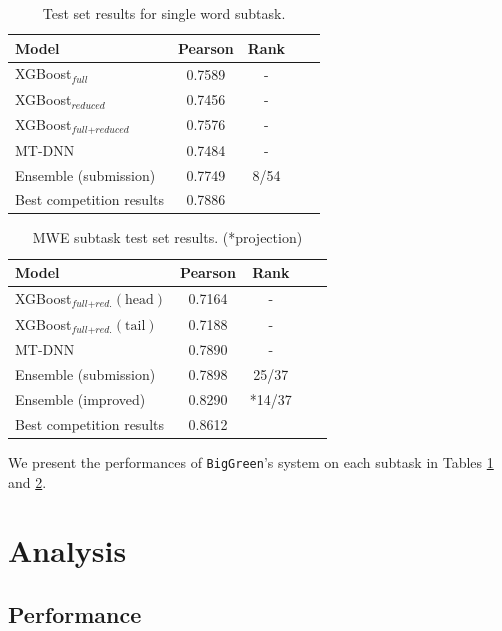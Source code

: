 \documentclass[11pt,a4paper]{article}
\begin{document}
\begin{table}
  \centering
  \begin{tabular}{lcccc}
  \hline \textbf{Model} & \textbf{Pearson} & \textbf{Rank} \\ \hline
  XGBoost$_\textit{full}$ &	0.7589 & - \\
  XGBoost$_\textit{reduced}$ &	0.7456 & - \\
  XGBoost$_{\textit{full}+\textit{reduced}}$ & 0.7576 & - \\
  MT-DNN & 0.7484 & - \\
  Ensemble (submission) & 0.7749 & 8/54 \\
  \hline
  Best competition results & 0.7886 & \\ 
  \hline
  \end{tabular}
  \caption{\label{tab:single-word-results} Test set results for single word subtask.}
\end{table}

\begin{table}
  \centering
  \begin{tabular}{lcccc}
  \hline \textbf{Model} & \textbf{Pearson} & \textbf{Rank} \\ \hline
  XGBoost$_{\textit{full}+\textit{red.}}(\text{head})$ & 0.7164 & - \\
  XGBoost$_{\textit{full}+\textit{red.}}(\text{tail})$ & 0.7188 & - \\
  MT-DNN & 0.7890 & - \\
  Ensemble (submission) & 0.7898 & 25/37 \\
  Ensemble (improved) & 0.8290 & *14/37 \\
  \hline
  Best competition results & 0.8612 & \\ 
  \hline
  \end{tabular}
  \caption{\label{tab:multi-word-results} MWE subtask test set results. (*projection)}
\end{table}

We present the performances of \texttt{BigGreen}'s system on each subtask in Tables \ref{tab:single-word-results} and \ref{tab:multi-word-results}.

\section{Analysis}

\subsection{Performance}
\end{document}
